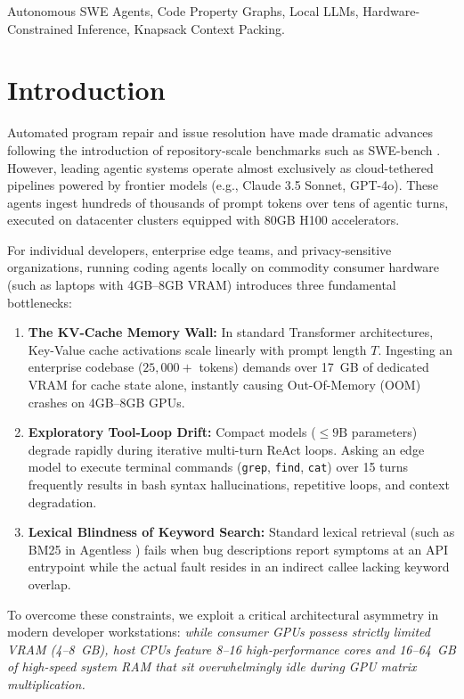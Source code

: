 \documentclass[conference]{IEEEtran}
\begin{document}
\begin{IEEEkeywords}
Autonomous SWE Agents, Code Property Graphs, Local LLMs, Hardware-Constrained Inference, Knapsack Context Packing.
\end{IEEEkeywords}

\section{Introduction}
Automated program repair and issue resolution have made dramatic advances following the introduction of repository-scale benchmarks such as SWE-bench \cite{swebench}. However, leading agentic systems operate almost exclusively as cloud-tethered pipelines powered by frontier models (e.g., Claude 3.5 Sonnet, GPT-4o). These agents ingest hundreds of thousands of prompt tokens over tens of agentic turns, executed on datacenter clusters equipped with 80GB H100 accelerators.

For individual developers, enterprise edge teams, and privacy-sensitive organizations, running coding agents locally on commodity consumer hardware (such as laptops with 4GB--8GB VRAM) introduces three fundamental bottlenecks:
\begin{enumerate}
    \item \textbf{The KV-Cache Memory Wall:} In standard Transformer architectures, Key-Value cache activations scale linearly with prompt length $T$. Ingesting an enterprise codebase ($25,000+$ tokens) demands over 17~GB of dedicated VRAM for cache state alone, instantly causing Out-Of-Memory (OOM) crashes on 4GB--8GB GPUs.
    \item \textbf{Exploratory Tool-Loop Drift:} Compact models ($\le 9\text{B}$ parameters) degrade rapidly during iterative multi-turn ReAct loops. Asking an edge model to execute terminal commands (\texttt{grep}, \texttt{find}, \texttt{cat}) over 15 turns frequently results in bash syntax hallucinations, repetitive loops, and context degradation.
    \item \textbf{Lexical Blindness of Keyword Search:} Standard lexical retrieval (such as BM25 in Agentless \cite{agentless}) fails when bug descriptions report symptoms at an API entrypoint while the actual fault resides in an indirect callee lacking keyword overlap.
\end{enumerate}

To overcome these constraints, we exploit a critical architectural asymmetry in modern developer workstations: \textit{while consumer GPUs possess strictly limited VRAM (4--8~GB), host CPUs feature 8--16 high-performance cores and 16--64~GB of high-speed system RAM that sit overwhelmingly idle during GPU matrix multiplication.}
\end{document}
